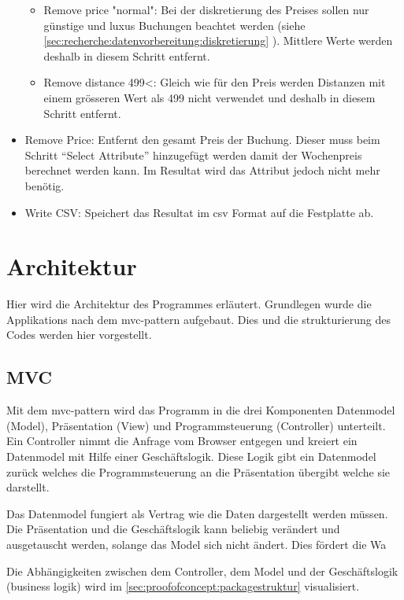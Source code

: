 \begin{itemize}
\begin{itemize}
			\item Remove price "normal": Bei der diskretierung des Preises sollen nur günstige und luxus Buchungen beachtet werden (siehe \cref{sec:recherche:datenvorbereitung:diskretierung} ). Mittlere Werte werden deshalb in diesem Schritt entfernt.
			\item Remove distance 499<: Gleich wie für den Preis werden Distanzen mit einem grösseren Wert als 499 nicht verwendet und deshalb in diesem Schritt entfernt.
 		\end{itemize}
 	\item Remove Price: Entfernt den gesamt Preis der Buchung. Dieser muss beim Schritt "`Select Attribute"' hinzugefügt werden damit der Wochenpreis berechnet werden kann. Im Resultat wird das Attribut jedoch nicht mehr benötig.
 	\item Write CSV: Speichert das Resultat im \gls{csv} Format auf die Festplatte ab.
 \end{itemize}

\section{Architektur}
\label{sec:proofofconcept:architektur}
Hier wird die Architektur des Programmes erläutert. Grundlegen wurde die Applikations nach dem \gls{mvc}-\gls{pattern} aufgebaut. Dies und die strukturierung des Codes werden hier vorgestellt.

\subsection{MVC}
\label{sec:proofofconcept:architektur:mvc}
Mit dem \gls{mvc}-\gls{pattern} wird das Programm in die drei Komponenten Datenmodel (Model), Präsentation (View) und Programmsteuerung (Controller) unterteilt. Ein Controller nimmt die Anfrage vom Browser entgegen und kreiert ein Datenmodel mit Hilfe einer Geschäftslogik. Diese Logik gibt ein Datenmodel zurück welches die Programmsteuerung an die Präsentation übergibt welche sie darstellt.

Das Datenmodel fungiert als Vertrag wie die Daten dargestellt werden müssen. Die Präsentation und die Geschäftslogik kann beliebig verändert und ausgetauscht werden, solange das Model sich nicht ändert. Dies fördert die Wa

Die Abhängigkeiten zwischen dem Controller, dem Model und der Geschäftslogik (business logik) wird im \cref{sec:proofofconcept:packagestruktur} visualisiert.

